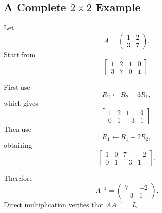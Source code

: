 \subsection{A Complete $2\times2$ Example}

Let
\[
A=\begin{pmatrix}1&2\\3&7\end{pmatrix}.
\]
Start from
\[
\left[\begin{array}{cc|cc}
1&2&1&0\\
3&7&0&1
\end{array}\right].
\]

\begin{derivationbox}
First use
\[
R_2\leftarrow R_2-3R_1,
\]
which gives
\[
\left[\begin{array}{cc|cc}
1&2&1&0\\
0&1&-3&1
\end{array}\right].
\]
Then use
\[
R_1\leftarrow R_1-2R_2,
\]
obtaining
\[
\left[\begin{array}{cc|cc}
1&0&7&-2\\
0&1&-3&1
\end{array}\right].
\]
\end{derivationbox}

Therefore
\[
\boxed{A^{-1}=\begin{pmatrix}7&-2\\-3&1\end{pmatrix}}.
\]
Direct multiplication verifies that $AA^{-1}=I_2$.
